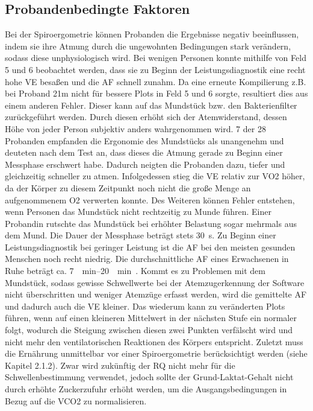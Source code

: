 \subsection{Probandenbedingte Faktoren}
%
Bei der Spiroergometrie können Probanden die Ergebnisse negativ beeinflussen, indem sie ihre Atmung durch die ungewohnten Bedingungen stark verändern, sodass diese unphysiologisch wird. Bei wenigen Personen konnte mithilfe von Feld 5 und 6 beobachtet werden, dass sie zu Beginn der Leistungsdiagnostik eine recht hohe \gls{VE} besaßen und die \gls{AF} schnell zunahm. Da eine erneute Kompilierung z.B. bei Proband 21m nicht für bessere Plots in Feld 5 und 6 sorgte, resultiert dies aus einem anderen Fehler. Dieser kann auf das Mundstück bzw. den Bakterienfilter zurückgeführt werden. Durch diesen erhöht sich der Atemwiderstand, dessen Höhe von jeder Person subjektiv anders wahrgenommen wird. 7 der 28 Probanden empfanden die Ergonomie des Mundstücks als unangenehm und deuteten nach dem Test an, dass dieses die Atmung gerade zu Beginn einer Messphase erschwert habe. Dadurch neigten die Probanden dazu, tiefer und gleichzeitig schneller zu atmen. Infolgedessen stieg die \gls{VE} relativ zur \gls{VO2} höher, da der Körper zu diesem Zeitpunkt noch nicht die große Menge an aufgenommenem \gls{O2} verwerten konnte. Des Weiteren können Fehler entstehen, wenn Personen das Mundstück nicht rechtzeitig zu Munde führen. Einer Probandin rutschte das Mundstück bei erhöhter Belastung sogar mehrmals aus dem Mund. Die Dauer der Messphase beträgt stets \SI{30}{\second}. Zu Beginn einer Leistungsdiagnostik bei geringer Leistung ist die \gls{AF} bei den meisten gesunden Menschen noch recht niedrig. Die durchschnittliche \gls{AF} eines Erwachsenen in Ruhe beträgt ca. \SIrange{7}{20}{\per\minute}~\cite{Larsen.2017}. Kommt es zu Problemen mit dem Mundstück, sodass gewisse Schwellwerte bei der Atemzugerkennung der Software nicht überschritten und weniger Atemzüge erfasst werden, wird die gemittelte \gls{AF} und dadurch auch die \gls{VE} kleiner. Das wiederum kann zu veränderten Plots führen, wenn auf einen kleineren Mittelwert in der nächsten Stufe ein normaler folgt, wodurch die Steigung zwischen diesen zwei Punkten verfälscht wird und nicht mehr den ventilatorischen Reaktionen des Körpers entspricht. Zuletzt muss die Ernährung unmittelbar vor einer Spiroergometrie berücksichtigt werden (siehe Kapitel 2.1.2). Zwar wird zukünftig der RQ nicht mehr für die Schwellenbestimmung verwendet, jedoch sollte der Grund-Laktat-Gehalt nicht durch erhöhte Zuckerzufuhr erhöht werden, um die Ausgangsbedingungen in Bezug auf die \gls{VCO2} zu normalisieren.
%
